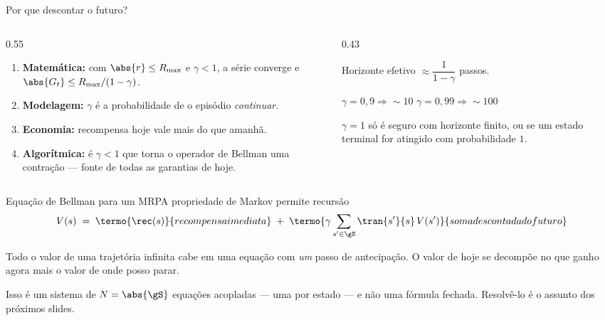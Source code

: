\documentclass[aspectratio=169, 11pt]{beamer}
\newcommand{\Rmax}{R_{\max}}
\begin{document}
\begin{frame}{Por que descontar o futuro?}
  \begin{columns}[T]
    \begin{column}{0.55\textwidth}
      \begin{enumerate}\setlength{\itemsep}{0.7ex}
        \item \textbf{Matemática:} com $\abs{r} \le \Rmax$ e $\gamma<1$, a série
              converge e $\abs{G_t} \le \Rmax/(1-\gamma)$.
        \item \textbf{Modelagem:} $\gamma$ é a probabilidade de o episódio
              \emph{continuar}.
        \item \textbf{Economia:} recompensa hoje vale mais do que amanhã.
        \item \textbf{Algorítmica:} é $\gamma<1$ que torna o operador de Bellman uma
              \alert{contração} --- fonte de todas as garantias de hoje.
      \end{enumerate}
    \end{column}
    \begin{column}{0.43\textwidth}
      \begin{ideiabox}
        Horizonte efetivo $\approx \dfrac{1}{1-\gamma}$ passos.
        \smallskip

        $\gamma = 0{,}9 \Rightarrow \sim\!10$ \qquad
        $\gamma = 0{,}99 \Rightarrow \sim\!100$
      \end{ideiabox}
      \begin{alertabox}
        $\gamma = 1$ só é seguro com horizonte finito, ou se um estado terminal for
        atingido com probabilidade $1$.
      \end{alertabox}
    \end{column}
  \end{columns}
\end{frame}

\begin{frame}{Equação de Bellman para um MRP}{A propriedade de Markov permite recursão}
  \[
    V(s) \;=\; \termo{\rec(s)}{recompensa imediata}
    \;+\; \termo{\gamma \sum_{s' \in \gS} \tran{s'}{s}\, V(s')}{soma descontada do futuro}
  \]
  \vspace{0.4em}
  \begin{ideiabox}
    Todo o valor de uma trajetória infinita cabe em uma equação com \emph{um} passo de
    antecipação. O valor de hoje se decompõe no que ganho agora mais o valor de onde
    posso parar.
  \end{ideiabox}
  \begin{alertabox}
    Isso é um \alert{sistema} de $N = \abs{\gS}$ equações acopladas --- uma por estado ---
    e não uma fórmula fechada. Resolvê-lo é o assunto dos próximos slides.
  \end{alertabox}
\end{frame}
\end{document}
